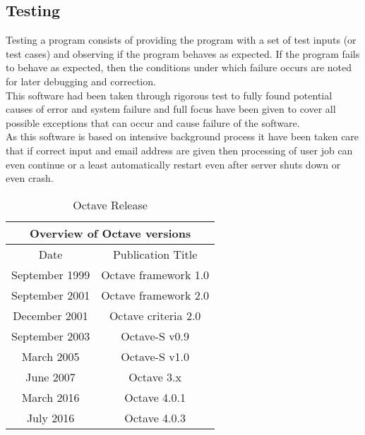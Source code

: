 \subsection*{Testing}
Testing a program consists of providing the program with a set of test inputs (or test cases) and
observing if the program behaves as expected. If the program fails to behave as expected, then the
conditions under which failure occurs are noted for later debugging and correction. \\
This software had been taken through rigorous test to fully found potential causes of error and system failure
and full focus have been given to cover all possible exceptions that can 
occur and cause failure of the software.\\
As this software is based on intensive background process it have been taken care that 
if correct input and email address are given then processing of user job can even continue or a least automatically 
restart even after server shuts down or even crash.
\begin{table}[h]
\centering
\begin{tabular}{ ||c|c|| }
\hline
 \multicolumn{2}{||c||}{Overview of Octave versions} \\
 \hline
 Date & Publication Title \\ [0.5ex] 
 \hline \hline
	September 1999 & Octave framework 1.0 \\ \hline
	September 2001 & Octave framework 2.0 \\ \hline
	December 2001 & Octave criteria 2.0\\ \hline
	September 2003 & Octave-S v0.9 \\ \hline
	March 2005 & Octave-S v1.0 \\ \hline
	June 2007 & Octave 3.x\\ \hline
        March 2016 &  Octave 4.0.1        \\ \hline
	July 2016 & Octave 4.0.3 \\ [1ex]
 \hline
\end{tabular}
\caption{Octave Release}
\label{table2}
\end{table}

